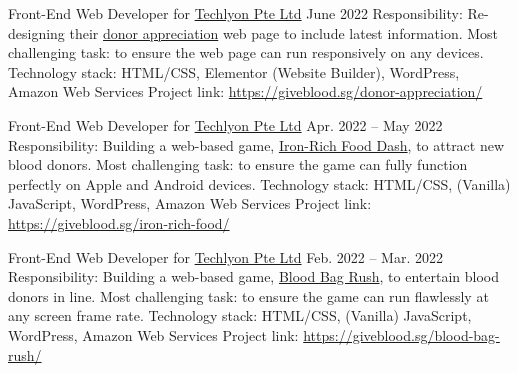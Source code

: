 \begin{cventries}

\cventry
{Front-End Web Developer for \href{https://helloakin.com/}{Techlyon Pte Ltd}} %
{} %
{} %
{June 2022} %
{ %
Responsibility: Re-designing their \href{https://giveblood.sg/donor-appreciation/}{donor appreciation} web page to include latest information.
\linebreak
Most challenging task: to ensure the web page can run responsively on any devices.
\linebreak
Technology stack: HTML/CSS, Elementor (Website Builder), WordPress, Amazon Web Services
\linebreak
Project link: \href{https://giveblood.sg/donor-appreciation/}{https://giveblood.sg/donor-appreciation/}
}


\cventry
{Front-End Web Developer for \href{https://helloakin.com/}{Techlyon Pte Ltd}} %
{} %
{} %
{Apr. 2022 -- May 2022} %
{ %
Responsibility: Building a web-based game, \href{https://giveblood.sg/iron-rich-food/}{Iron-Rich Food Dash}, to attract new blood donors.
\linebreak
Most challenging task: to ensure the game can fully function perfectly on Apple and Android devices.
\linebreak
Technology stack: HTML/CSS, (Vanilla) JavaScript, WordPress, Amazon Web Services
\linebreak
Project link: \href{https://giveblood.sg/iron-rich-food/}{https://giveblood.sg/iron-rich-food/}
}


\cventry
{Front-End Web Developer for \href{https://helloakin.com/}{Techlyon Pte Ltd}} %
{} %
{} %
{Feb. 2022 -- Mar. 2022} %
{ %
Responsibility: Building a web-based game, \href{https://giveblood.sg/blood-bag-rush/}{Blood Bag Rush}, to entertain blood donors in line.
\linebreak
Most challenging task: to ensure the game can run flawlessly at any screen frame rate.
\linebreak
Technology stack: HTML/CSS, (Vanilla) JavaScript, WordPress, Amazon Web Services
\linebreak
Project link: \href{https://giveblood.sg/blood-bag-rush/}{https://giveblood.sg/blood-bag-rush/}
}


\end{cventries}
